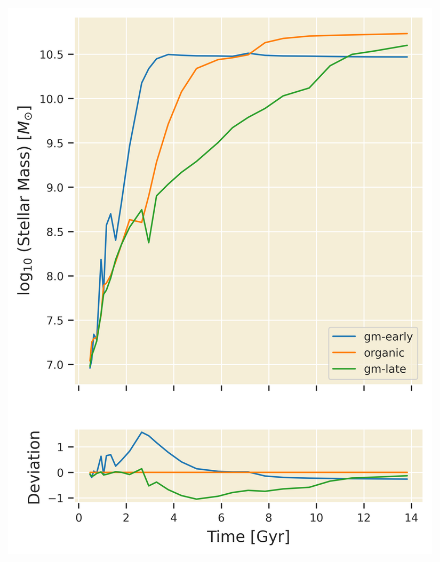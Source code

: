 \documentclass[twocolumn]{article}
\begin{document}
	\begin{figure}
			\centering 
			\includegraphics[width=\columnwidth]{./Stellar_mass.png}
	\end{figure}
\end{document}
